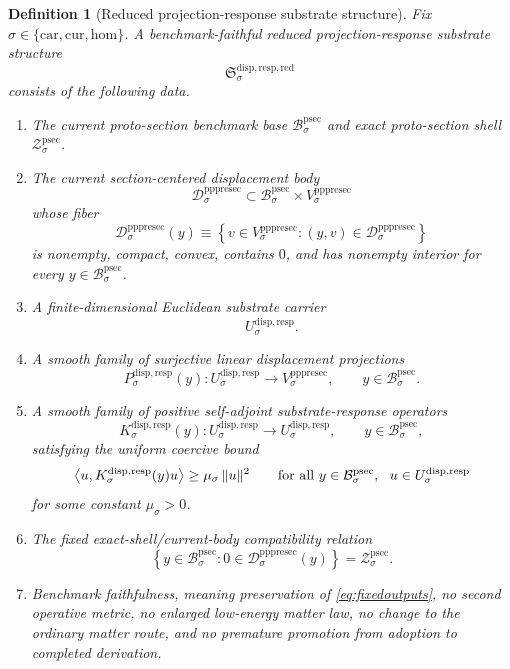 \documentclass[11pt]{article}
\newcommand{\Car}{\mathrm{car}}
\newcommand{\Cur}{\mathrm{cur}}
\newcommand{\Hom}{\mathrm{hom}}
\newcommand{\ProtoSectionBody}[1]{\mathcal B_{#1}^{\mathrm{psec}}}
\newcommand{\ProtoSectionShell}[1]{\mathcal Z_{#1}^{\mathrm{psec}}}
\newcommand{\PrePreProtoSectionVertical}[1]{V_{#1}^{\mathrm{pppresec}}}
\newcommand{\PrePreProtoSectionResidualBody}[1]{\mathcal D_{#1}^{\mathrm{pppresec}}}
\newcommand{\ReducedStructure}{\mathfrak S^{\mathrm{disp,resp,red}}}
\newcommand{\SubstrateCarrier}[1]{U_{#1}^{\mathrm{disp,resp}}}
\newcommand{\SubstrateProjection}[1]{P_{#1}^{\mathrm{disp,resp}}}
\newcommand{\SubstrateOperator}[1]{K_{#1}^{\mathrm{disp,resp}}}
\newtheorem{definition}{Definition}
\begin{document}
\begin{definition}[Reduced projection-response substrate structure]
\label{def:structure}
Fix \(\sigma\in\{\Car,\Cur,\Hom\}\). A \emph{benchmark-faithful reduced projection-response substrate structure}
\[
\ReducedStructure_{\sigma}
\]
consists of the following data.
\begin{enumerate}
    \item The current proto-section benchmark base \(\ProtoSectionBody{\sigma}\) and exact proto-section shell \(\ProtoSectionShell{\sigma}\).
    \item The current section-centered displacement body
    \[
    \PrePreProtoSectionResidualBody{\sigma}
    \subset
    \ProtoSectionBody{\sigma}\times\PrePreProtoSectionVertical{\sigma}
    \]
    whose fiber
    \[
    \PrePreProtoSectionResidualBody{\sigma}(y)
    \equiv
    \left\{
    v\in\PrePreProtoSectionVertical{\sigma}:(y,v)\in\PrePreProtoSectionResidualBody{\sigma}
    \right\}
    \]
    is nonempty, compact, convex, contains \(0\), and has nonempty interior for every \(y\in\ProtoSectionBody{\sigma}\).
    \item A finite-dimensional Euclidean substrate carrier
    \[
    \SubstrateCarrier{\sigma}.
    \]
    \item A smooth family of surjective linear displacement projections
    \[
    \SubstrateProjection{\sigma}(y):
    \SubstrateCarrier{\sigma}\to\PrePreProtoSectionVertical{\sigma},
    \qquad
    y\in\ProtoSectionBody{\sigma}.
    \]
    \item A smooth family of positive self-adjoint substrate-response operators
    \[
    \SubstrateOperator{\sigma}(y):
    \SubstrateCarrier{\sigma}\to\SubstrateCarrier{\sigma},
    \qquad
    y\in\ProtoSectionBody{\sigma},
    \]
    satisfying the uniform coercive bound
    \begin{equation}
    \ev{u,\SubstrateOperator{\sigma}(y)u}
    \ge
    \mu_{\sigma}\,\|u\|^2
    \qquad
    \text{for all }
    y\in\ProtoSectionBody{\sigma},
    \ \ u\in\SubstrateCarrier{\sigma}
    \label{eq:coercive}
    \end{equation}
    for some constant \(\mu_{\sigma}>0\).
    \item The fixed exact-shell/current-body compatibility relation
    \[
    \left\{
    y\in\ProtoSectionBody{\sigma}:0\in\PrePreProtoSectionResidualBody{\sigma}(y)
    \right\}
    =
    \ProtoSectionShell{\sigma}.
    \]
    \item Benchmark faithfulness, meaning preservation of \eqref{eq:fixedoutputs}, no second operative metric, no enlarged low-energy matter law, no change to the ordinary matter route, and no premature promotion from adoption to completed derivation.
\end{enumerate}
\end{definition}
\end{document}
